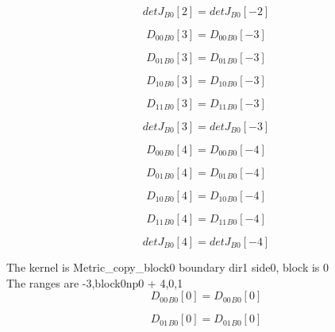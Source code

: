 \documentclass{article}
\begin{document}
\begin{dmath}{detJ{_{B0}}}[{2}] = {detJ{_{B0}}}[{-2}]\end{dmath}

\begin{dmath}{D_{00}{_{B0}}}[{3}] = {D_{00}{_{B0}}}[{-3}]\end{dmath}

\begin{dmath}{D_{01}{_{B0}}}[{3}] = {D_{01}{_{B0}}}[{-3}]\end{dmath}

\begin{dmath}{D_{10}{_{B0}}}[{3}] = {D_{10}{_{B0}}}[{-3}]\end{dmath}

\begin{dmath}{D_{11}{_{B0}}}[{3}] = {D_{11}{_{B0}}}[{-3}]\end{dmath}

\begin{dmath}{detJ{_{B0}}}[{3}] = {detJ{_{B0}}}[{-3}]\end{dmath}

\begin{dmath}{D_{00}{_{B0}}}[{4}] = {D_{00}{_{B0}}}[{-4}]\end{dmath}

\begin{dmath}{D_{01}{_{B0}}}[{4}] = {D_{01}{_{B0}}}[{-4}]\end{dmath}

\begin{dmath}{D_{10}{_{B0}}}[{4}] = {D_{10}{_{B0}}}[{-4}]\end{dmath}

\begin{dmath}{D_{11}{_{B0}}}[{4}] = {D_{11}{_{B0}}}[{-4}]\end{dmath}

\begin{dmath}{detJ{_{B0}}}[{4}] = {detJ{_{B0}}}[{-4}]\end{dmath}

\noindent The kernel is Metric_copy_block0 boundary dir1 side0, block is 0\\\noindent The ranges are -3,block0np0 + 4,0,1\\\begin{dmath}{D_{00}{_{B0}}}[{0}] = {D_{00}{_{B0}}}[{0}]\end{dmath}

\begin{dmath}{D_{01}{_{B0}}}[{0}] = {D_{01}{_{B0}}}[{0}]\end{dmath}
\end{document}
